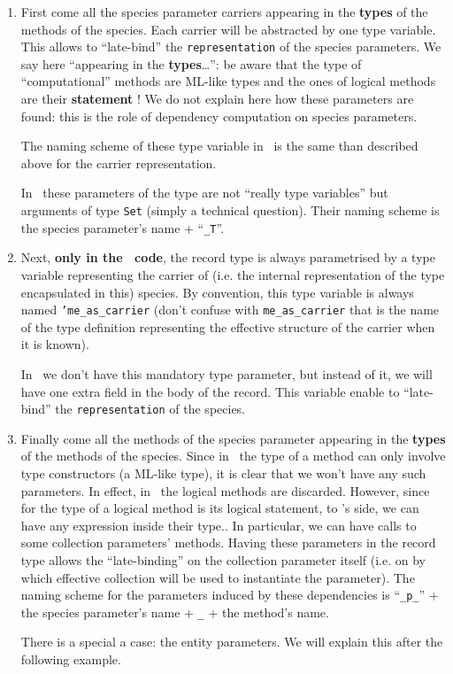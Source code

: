 \begin{enumerate}
\item First come all the species parameter carriers appearing in the
  {\bf types} of the methods of the species. Each carrier will be
  abstracted by one type variable. This allows to ``late-bind'' the
  {\tt representation} of the species parameters. We say here 
  ``appearing in the {\bf types}\ldots'': be aware that the type of
  ``computational'' methods are ML-like types and the ones of logical
  methods are their {\bf statement} ! We do not explain here how these
  parameters are found: this is the role of dependency computation on
  species parameters.

  The naming scheme of these type variable in \ocaml\ is the same than
  described above for the carrier representation.

  In \coq\, these parameters of the type are not ``really type
  variables'' but arguments of type {\tt Set} (simply a technical
  question). Their naming scheme is the species parameter's name +
  ``{\tt \_T}''.

\item Next, {\bf only in the \ocaml\ code}, the record type is always
  parametrised by a type variable representing the carrier of
  (i.e. the internal representation of the type encapsulated in this)
  species. By convention, this type variable is always named
  {\tt 'me\_as\_carrier} (don't confuse with {\tt me\_as\_carrier}
  that is the name of the type definition representing the effective
  structure of the carrier when it is known).

  In \coq\ we don't have this mandatory type parameter, but instead of
  it, we will have one extra field in the body of the record. This
  variable enable to ``late-bind'' the {\tt representation} of the
  species.

\item Finally come all the methods of the species parameter appearing
  in the {\bf types} of the methods of the species. Since in \ocaml\
  the type of a method can only involve type constructors (a ML-like
  type), it is clear that we won't have any such parameters. In
  effect, in \ocaml\ the logical methods are discarded. However,
  since for the type of a logical method is its logical statement, to
  \coq's side, we can have any expression inside their type.. In
  particular, we can have calls to some collection parameters'
  methods. Having these parameters in the record type allows the
  ``late-binding'' on the collection parameter itself (i.e. on by
  which effective collection will be used to instantiate the
  parameter). The naming scheme for the parameters induced by these
  dependencies is ``{\tt \_p\_}'' + the species parameter's name  +
  {\tt \_} + the method's name.

  There is a special a case: the entity parameters. We will explain
  this after the following example.
\end{enumerate}


